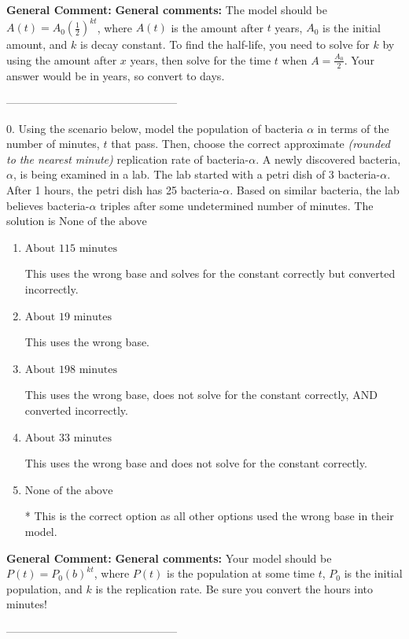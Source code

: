 \documentclass{extbook}[14pt]
\begin{document}
\textbf{General Comment:} \textbf{General comments:} The model should be $A(t) = A_0 (\frac{1}{2})^{kt}$, where $A(t)$ is the amount after $t$ years, $A_0$ is the initial amount, and $k$ is decay constant. To find the half-life, you need to solve for $k$ by using the amount after $x$ years, then solve for the time $t$ when $A = \frac{A_0}{2}$. Your answer would be in years, so convert to days. 

-----------------------------------------------

0. Using the scenario below, model the population of bacteria $\alpha$ in terms of the number of minutes, $t$ that pass. Then, choose the correct approximate \textit{(rounded to the nearest minute)} replication rate of bacteria-$\alpha$.
A newly discovered bacteria, $\alpha$, is being examined in a lab. The lab started with a petri dish of 3 bacteria-$\alpha$. After 1 hours, the petri dish has 25 bacteria-$\alpha$. Based on similar bacteria, the lab believes bacteria-$\alpha$ triples after some undetermined number of minutes. 
The solution is $ \text{None of the above} $ 

\begin{enumerate}[label=\Alph*.] 
\item $ \text{About } 115 \text{ minutes} $ 

 This uses the wrong base and solves for the constant correctly but converted incorrectly. 
\item $ \text{About } 19 \text{ minutes} $ 

 This uses the wrong base. 
\item $ \text{About } 198 \text{ minutes} $ 

 This uses the wrong base, does not solve for the constant correctly, AND converted incorrectly. 
\item $ \text{About } 33 \text{ minutes} $ 

 This uses the wrong base and does not solve for the constant correctly. 
\item $ \text{None of the above} $ 

 * This is the correct option as all other options used the wrong base in their model. 
\end{enumerate} 
 
\textbf{General Comment:} \textbf{General comments:} Your model should be $P(t) = P_0(b)^{kt}$, where $P(t)$ is the population at some time $t$, $P_0$ is the initial population, and $k$ is the replication rate. Be sure you convert the hours into minutes! 

-----------------------------------------------
\end{document}
